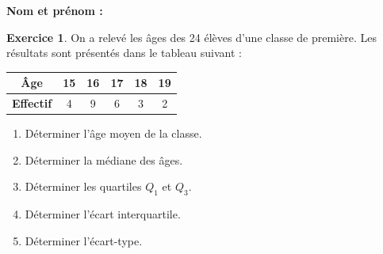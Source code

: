 \documentclass{article}
\theoremstyle{definition}
\newtheorem{exercice}{Exercice}
\begin{document}
\pagestyle{fancy}

\fancyhf{} %
\fancyhead[L]{\large \textbf{\Niveau}}
\fancyhead[C]{\large \textbf{\ChapitreCourt}}

\large

\textbf{Nom et prénom :}\enspace\dotfill

\vfill

\begin{exercice}
  On a relevé les âges des 24 élèves d’une classe de première. Les résultats sont présentés dans le tableau suivant :

  \begin{center}
    \renewcommand{\arraystretch}{1.5}
    \begin{tabular}{|c|c|c|c|c|c|}
      \hline
      \textbf{Âge}        & 15 & 16 & 17 & 18 & 19 \\
      \hline
      \textbf{Effectif}   &  4 & 9 &  6 &  3 &  2 \\
      \hline
    \end{tabular}
  \end{center}

  \begin{enumerate}
    \item Déterminer l’âge moyen de la classe.
    \item Déterminer la médiane des âges.
    \item Déterminer les quartiles $Q_1$ et $Q_3$.
    \item Déterminer l’écart interquartile.
    \item Déterminer l’écart-type.
  \end{enumerate}
\end{exercice}

\vfill
\end{document}

